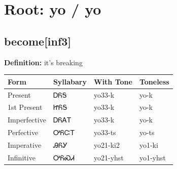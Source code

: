\documentclass{article}%
\begin{document}
%
\normalsize%
\section*{Root: yo / yo}%
\subsection*{become[inf3]}%
\textbf{Definition: }%
it’s breaking%
\\[0.5em]%
\begin{tabular}{|l|l|l|l|}%
\hline%
\textbf{Form}&\textbf{Syllabary}&\textbf{With Tone}&\textbf{Toneless}\\%
\hline%
Present&ᎠᏲᎦ&yo33{-}k&yo{-}k\\%
1st Present&ᏥᏲᎦ&yo33{-}k&yo{-}k\\%
Imperfective&ᎠᏲᎪᎢ&yo33{-}k&yo{-}k\\%
Perfective&ᎤᏲᏨᎢ&yo33{-}ts&yo{-}ts\\%
Imperative&ᎯᏲᎩ&yo21{-}ki2&yo1{-}ki\\%
Infinitive&ᎤᏲᏍᏗ&yo21{-}yhst&yo1{-}yhst\\%
\hline%
\end{tabular}%
\\[1em]%
\end{document}
